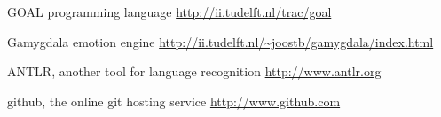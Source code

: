 \documentclass[]{article}
\begin{document}
\clearpage
\printglossaries
\begin{thebibliography}{9}
	
	GOAL programming language
	\url{http://ii.tudelft.nl/trac/goal}
	
	Gamygdala emotion engine
	\url{http://ii.tudelft.nl/~joostb/gamygdala/index.html}
	
	ANTLR, another tool for language recognition
	\url{http://www.antlr.org}

	github, the online git hosting service
	\url{http://www.github.com}
	
	
\end{thebibliography}
\end{document}
